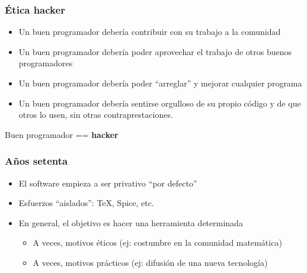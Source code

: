 \documentclass{beamer}
\begin{document}
\begin{frame}
\frametitle{Ética hacker}

\begin{itemize}
\item {Un buen programador debería contribuir con su trabajo a la
comunidad}
\item {Un buen programador debería poder aprovechar el trabajo de otros
buenos programadores}
\item {Un buen programador debería poder ``arreglar'' y mejorar cualquier
programa}
\item {Un buen programador debería sentirse orgulloso de su propio
código y de que otros lo usen, sin otras contraprestaciones.}
\end{itemize}

\pause

\begin{center}
\alert{Buen programador == \textbf{hacker}}
\end{center}

\end{frame}



\begin{frame}
\frametitle{Años setenta}

\begin{itemize}

\item El software empieza a ser privativo ``por defecto''
\item Esfuerzos ``aislados'': TeX, Spice, etc.
\item En general, el objetivo es hacer una herramienta determinada
	\begin{itemize}
	\item A veces, motivos éticos (ej: costumbre en la comunidad matemática)
	\item A veces, motivos prácticos (ej: difusión de una nueva tecnología)
	\end{itemize}
\end{itemize}

\end{frame}


\end{document}
